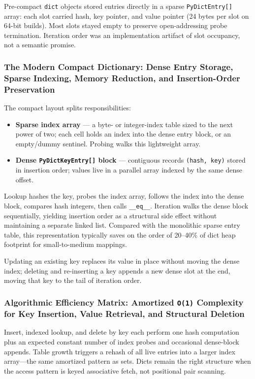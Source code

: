 \documentclass[a4paper,twoside]{report}
\begin{document}
Pre-compact \texttt{dict} objects stored entries directly in a sparse \texttt{PyDictEntry[]} array: each slot carried hash, key pointer, and value pointer (24 bytes per slot on 64-bit builds). Most slots stayed empty to preserve open-addressing probe termination. Iteration order was an implementation artifact of slot occupancy, not a semantic promise.

\subsubsection{The Modern Compact Dictionary: Dense Entry Storage, Sparse Indexing, Memory Reduction, and Insertion-Order Preservation}

The compact layout splits responsibilities:

\begin{itemize}
    \item \textbf{Sparse index array} --- a byte- or integer-index table sized to the next power of two; each cell holds an index into the dense entry block, or an empty/dummy sentinel. Probing walks this lightweight array.
    \item \textbf{Dense \texttt{PyDictKeyEntry[]} block} --- contiguous records \texttt{(hash, key)} stored in insertion order; values live in a parallel array indexed by the same dense offset.
\end{itemize}

Lookup hashes the key, probes the index array, follows the index into the dense block, compares hash integers, then calls \texttt{\_\_eq\_\_}. Iteration walks the dense block sequentially, yielding insertion order as a structural side effect without maintaining a separate linked list. Compared with the monolithic sparse entry table, this representation typically saves on the order of 20--40\% of dict heap footprint for small-to-medium mappings.

Updating an existing key replaces its value in place without moving the dense index; deleting and re-inserting a key appends a new dense slot at the end, moving that key to the tail of iteration order.

\subsubsection{Algorithmic Efficiency Matrix: Amortized \texttt{O(1)} Complexity for Key Insertion, Value Retrieval, and Structural Deletion}

Insert, indexed lookup, and delete by key each perform one hash computation plus an expected constant number of index probes and occasional dense-block appends. Table growth triggers a rehash of all live entries into a larger index array---the same amortized pattern as sets. Dicts remain the right structure when the access pattern is keyed associative fetch, not positional pair scanning.
\end{document}
